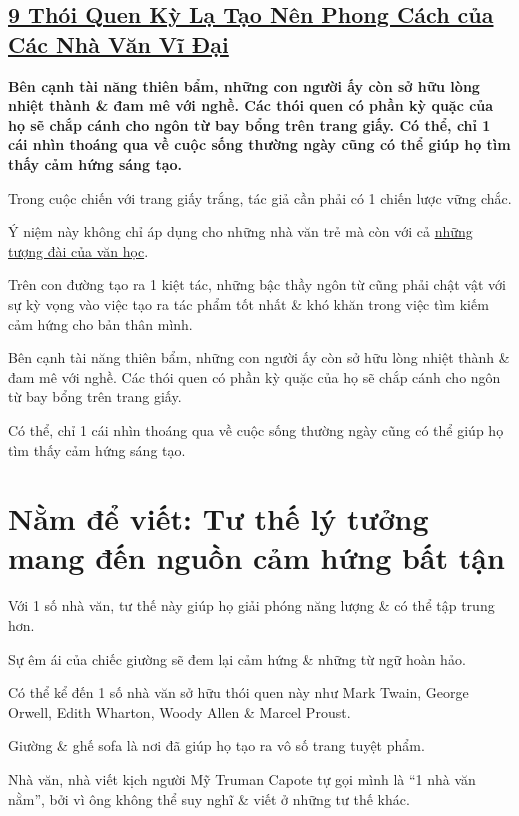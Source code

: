 \documentclass{article}
\begin{document}
\subsection{\href{http://tramdoc.vn/tin-tuc/9-thoi-quen-ky-la-tao-nen-phong-cach-cua-cac-nha-van-vi-dai-nmwejW.html}{9 Thói Quen Kỳ Lạ Tạo Nên Phong Cách của Các Nhà Văn Vĩ Đại}}

\textbf{Bên cạnh tài năng thiên bẩm, những con người ấy còn sở hữu lòng nhiệt thành \& đam mê với nghề. Các thói quen có phần kỳ quặc của họ sẽ chắp cánh cho ngôn từ bay bổng trên trang giấy. Có thể, chỉ 1 cái nhìn thoáng qua về cuộc sống thường ngày cũng có thể giúp họ tìm thấy cảm hứng sáng tạo.}

%
Trong cuộc chiến với trang giấy trắng, tác giả cần phải có 1 chiến lược vững chắc.

Ý niệm này không chỉ áp dụng cho những nhà văn trẻ mà còn với cả \href{http://tramdoc.vn/tin-tuc/10-tac-pham-kinh-dien-tu-giai-nobel-van-hoc-da-duoc-dich-sang-tieng-viet-nyalW.html}{những tượng đài của văn học}.

Trên con đường tạo ra 1 kiệt tác, những bậc thầy ngôn từ cũng phải chật vật với sự kỳ vọng vào việc tạo ra tác phẩm tốt nhất \& khó khăn trong việc tìm kiếm cảm hứng cho bản thân mình.

%
Bên cạnh tài năng thiên bẩm, những con người ấy còn sở hữu lòng nhiệt thành \& đam mê với nghề. Các thói quen có phần kỳ quặc của họ sẽ chắp cánh cho ngôn từ bay bổng trên trang giấy.

Có thể, chỉ 1 cái nhìn thoáng qua về cuộc sống thường ngày cũng có thể giúp họ tìm thấy cảm hứng sáng tạo.

\section{Nằm để viết: Tư thế lý tưởng mang đến nguồn cảm hứng bất tận}
Với 1 số nhà văn, tư thế này giúp họ giải phóng năng lượng \& có thể tập trung hơn.

Sự êm ái của chiếc giường sẽ đem lại cảm hứng \& những từ ngữ hoàn hảo.

Có thể kể đến 1 số nhà văn sở hữu thói quen này như Mark Twain, George Orwell, Edith Wharton, Woody Allen \& Marcel Proust.

Giường \& ghế sofa là nơi đã giúp họ tạo ra vô số trang tuyệt phẩm.

Nhà văn, nhà viết kịch người Mỹ Truman Capote tự gọi mình là ``1 nhà văn nằm'', bởi vì ông không thể suy nghĩ \& viết ở những tư thế khác.
\end{document}
